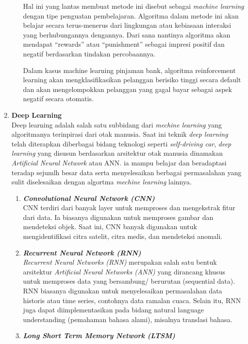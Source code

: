\begin{enumerate}
\begin{enumerate}[nolistsep]
        Hal ini yang lantas membuat metode ini disebut sebagai \textit{machine learning} dengan tipe penguatan pembelajaran. Algoritma dalam metode ini akan belajar secara terus-menerus dari lingkungan atau kebiasaan interaksi yang berhubungannya dengannya. Dari sana nantinya algoritma akan mendapat “rewards” atau “punishment” sebagai impresi positif dan negatif berdasarkan tindakan percobaannya.
      
        Dalam kasus machine learning pinjaman bank, algoritma reinforcement learning akan mengklasifikasikan pelanggan berisiko tinggi secara default dan akan mengelompokkan pelanggan yang gagal bayar sebagai aspek negatif secara otomatis.  
    \end{enumerate}
  \item \textbf{Deep Learning} \\ 
    Deep learning adalah salah satu subbidang dari \textit{mechine learning} yang algoritmanya terinpirasi dari otak manusia. Saat ini teknik \textit{deep learning} telah diterapkan diberbagai bidang teknologi seperti \textit{self-driving car}, \textit{deep learning} yang disusun berdasarkan arsitektur otak manusia dinamakan \textit{Artificial Neural Network} atau ANN. ia mampu belajar dan beradaptasi teradap sejumlh besar data serta menyelesaikan berbagai permasalahan yang sulit diselesaikan dengan algortma \textit{mechine learning} lainnya. 
    \begin{enumerate}[nolistsep]
      \item \textbf{\textit{Convolutional Neural Network (CNN)}}\\
        CNN terdiri dari banyak layer untuk memproses dan mengekstrak fitur dari data. Ia biasanya digunakan untuk memproses gambar dan mendeteksi objek. Saat ini, CNN banyak digunakan untuk mengidentifikasi citra satelit, citra medis, dan mendeteksi anomali.
      \item \textbf{\textit{Recurrent Neural Network (RNN)}}\\
        \textit{Recurrent Neural Networks (RNN)} merupakan salah satu bentuk arsitektur \textit{Artificial Neural Networks (ANN)} yang dirancang khusus untuk memproses data yang bersambung/ berurutan (sequential data). RNN biasanya digunakan untuk menyelesaikan permasalahan data historis atau time series, contohnya data ramalan cuaca. Selain itu, RNN juga dapat diimplementasikan pada bidang natural language understanding (pemahaman bahasa alami), misalnya  translasi bahasa.
      \item \textbf{\textit{{Long Short Term Memory Network (LTSM)}}}\\

\end{enumerate}
\end{enumerate}
